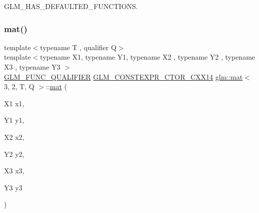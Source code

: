 G\+L\+M\+\_\+\+H\+A\+S\+\_\+\+D\+E\+F\+A\+U\+L\+T\+E\+D\+\_\+\+F\+U\+N\+C\+T\+I\+O\+NS. 

\mbox{\label{structglm_1_1mat_3_013_00_012_00_01_t_00_01_q_01_4_a83ed0230699667e599d391d6ccd411eb}} 
\subsubsection{\texorpdfstring{mat()}{mat()}\hspace{0.1cm}{\footnotesize\ttfamily [19/21]}}
{\footnotesize\ttfamily template$<$typename T , qualifier Q$>$ \\
template$<$typename X1, typename Y1, typename X2 , typename Y2 , typename X3 , typename Y3 $>$ \\
\hyperlink{setup_8hpp_a33fdea6f91c5f834105f7415e2a64407}{G\+L\+M\+\_\+\+F\+U\+N\+C\+\_\+\+Q\+U\+A\+L\+I\+F\+I\+ER} \hyperlink{setup_8hpp_a0900f9145e68bf6061b6f5e7be3fa751}{G\+L\+M\+\_\+\+C\+O\+N\+S\+T\+E\+X\+P\+R\+\_\+\+C\+T\+O\+R\+\_\+\+C\+X\+X14} \hyperlink{structglm_1_1mat}{glm\+::mat}$<$ 3, 2, T, Q $>$\+::\hyperlink{structglm_1_1mat}{mat} (\begin{DoxyParamCaption}\item[{X1}]{x1,  }\item[{Y1}]{y1,  }\item[{X2}]{x2,  }\item[{Y2}]{y2,  }\item[{X3}]{x3,  }\item[{Y3}]{y3 }\end{DoxyParamCaption})}

\mbox{\label{structglm_1_1mat_3_013_00_012_00_01_t_00_01_q_01_4_afe887fa3ecb498d777f704ccfbf90946}} 
